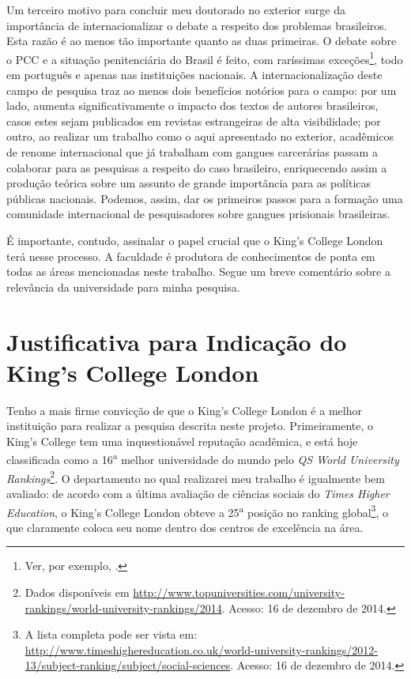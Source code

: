 \documentclass[a4paper,11pt]{article}
\begin{document}
Um terceiro motivo para concluir meu doutorado no exterior surge da importância de internacionalizar o debate a respeito dos problemas brasileiros. Esta razão é ao menos tão importante quanto as duas primeiras. O debate sobre o PCC e a situação penitenciária do Brasil é feito, com raríssimas exceções\footnote{Ver, por exemplo, \citet[]{darke2013inmate, king2014power}.}, todo em português e apenas nas instituições nacionais. A internacionalização deste campo de pesquisa traz ao menos dois benefícios notórios para o campo: por um lado, aumenta significativamente o impacto dos textos de autores brasileiros, casos estes sejam publicados em revistas estrangeiras de alta visibilidade; por outro, ao realizar um trabalho como o aqui apresentado no exterior, acadêmicos de renome internacional que já trabalham com gangues carcerárias passam a colaborar para as pesquisas a respeito do caso brasileiro, enriquecendo assim a produção teórica sobre um assunto de grande importância para as políticas públicas nacionais. Podemos, assim, dar os primeiros passos para a formação uma comunidade internacional de pesquisadores sobre gangues prisionais brasileiras. 

É importante, contudo, assinalar o papel crucial que o King's College London terá nesse processo. A faculdade é produtora de conhecimentos de ponta em todas as áreas mencionadas neste trabalho. Segue um breve comentário sobre a relevância da universidade para minha pesquisa.

\section{Justificativa para Indicação do King's College London}

Tenho a mais firme convicção de que o King's College London é a melhor instituição para realizar a pesquisa descrita neste projeto. Primeiramente, o King's College tem uma inquestionável reputação acadêmica, e está hoje classificada como a 16\textsuperscript{a} melhor universidade do mundo pelo \textit{QS World University Rankings}\footnote{Dados disponíveis em \href{http://www.topuniversities.com/university-rankings/world-university-rankings/2014}{http://www.topuniversities.com/university-rankings/world-university-rankings/2014}. Acesso: 16 de dezembro de 2014.}. O departamento no qual realizarei meu trabalho é igualmente bem avaliado:  de acordo com a última avaliação de ciências sociais do \textit{Times Higher Education}, o King's College London obteve a 25\textsuperscript{a} posição no ranking global\footnote{A lista completa pode ser vista em: \href{http://www.timeshighereducation.co.uk/world-university-rankings/2012-13/subject-ranking/subject/social-sciences}{http://www.timeshighereducation.co.uk/world-university-rankings/2012-13/subject-ranking/subject/social-sciences}. Acesso: 16 de dezembro de 2014.}, o que claramente coloca seu nome dentro dos centros de excelência na área.
\end{document}
